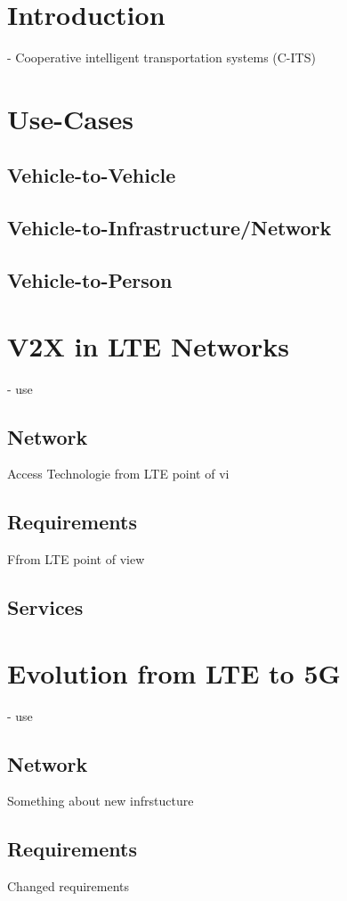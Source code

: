 \documentclass[conference,12pt,onecolumn]{IEEEtran}
\begin{document}
\section{Introduction}
- Cooperative intelligent transportation systems (C-ITS)

\section{Use-Cases}
\subsection{Vehicle-to-Vehicle}
\subsection{Vehicle-to-Infrastructure/Network}
\subsection{Vehicle-to-Person}


\section{V2X in LTE Networks}
- use \cite{araniti2013}
\subsection{Network}
Access Technologie from LTE point of vi

\subsection{Requirements}
Ffrom LTE point of view

\subsection{Services}

\section{Evolution from LTE to 5G}
- use \cite{lee2016}

\subsection{Network}
Something about new infrstucture

\subsection{Requirements}
Changed requirements
\end{document}
